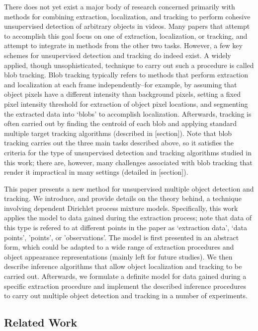 \documentclass{article}
\begin{document}
There does not yet exist a major body of research concerned primarily with methods for combining extraction, localization, and tracking to perform cohesive unsupervised detection of arbitrary objects in videos. Many papers that attempt to accomplish this goal focus on one of extraction, localization, or tracking, and attempt to integrate in methods from the other two tasks. However, a few key schemes for unsupervised detection and tracking do indeed exist. A widely applied, though unsophisticated, technique to carry out such a procedure is called blob tracking. Blob tracking typically refers to methods that perform extraction and localization at each frame independently--for example, by assuming that object pixels have a different intensity than background pixels, setting a fixed pixel intensity threshold for extraction of object pixel locations, and segmenting the extracted data into `blobs' to accomplish localization. Afterwards, tracking is often carried out by finding the centroid of each blob and applying standard multiple target tracking algorithms (described in [section]). Note that blob tracking carries out the three main tasks described above, so it satisfies the criteria for the type of unsupervised detection and tracking algorithms studied in this work; there are, however, many challenges associated with blob tracking that render it impractical in many settings (detailed in [section]).

This paper presents a new method for unsupervised multiple object detection and tracking. We introduce, and provide details on the theory behind, a technique involving dependent Dirichlet process mixture models. Specifically, this work applies the model to data gained during the extraction process; note that data of this type is refered to at different points in the paper as `extraction data', `data points', 'points', or 'observations'. The model is first presented in an abstract form, which could be adapted to a wide range of extraction procedures and object appearance representations (mainly left for future studies). We then describe inference algorithms that allow object localization and tracking to be carried out. Afterwards, we formulate a definite model for data gained during a specific extraction procedure and implement the described inference procedures to carry out multiple object detection and tracking in a number of experiments.


\subsection{Related Work}
\end{document}
